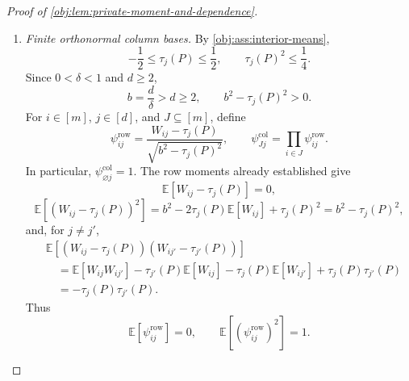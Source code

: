 \begin{proof}[Proof of \cref{obj:lem:private-moment-and-dependence}]
\begin{enumerate}
Fix \(J\in\mathcal J_k\). All moment weights are nonnegative, and the
subset \(J_{\mathrm{sub}}=J\cap J'\) is one of the terms in
\[
b^{2|J\cap J'|}
\bigl(\tau_j(P)^2\bigr)^{k-|J\cap J'|}
\le
\sum_{J_{\mathrm{sub}}\subseteq J\cap J'}
b^{2|J_{\mathrm{sub}}|}
\bigl(\tau_j(P)^2\bigr)^{k-|J_{\mathrm{sub}}|}.
\]
Summing over \(J'\), interchanging the finite sums, and applying the
inclusion count bound gives
\[
\begin{aligned}
&\sum_{J'\in\mathcal J_k}
b^{2|J\cap J'|}
\bigl(\tau_j(P)^2\bigr)^{k-|J\cap J'|}\\
&\quad\le
\sum_{J_{\mathrm{sub}}\subseteq J}
b^{2|J_{\mathrm{sub}}|}
\bigl(\tau_j(P)^2\bigr)^{k-|J_{\mathrm{sub}}|}
\#\{J'\in\mathcal J_k:J_{\mathrm{sub}}\subseteq J'\}\\
&\quad\le
\binom mk
\sum_{J_{\mathrm{sub}}\subseteq J}
\left(\frac{2kb^2}{m}\right)^{|J_{\mathrm{sub}}|}
\bigl(\tau_j(P)^2\bigr)^{k-|J_{\mathrm{sub}}|}\\
&\quad=
\binom mk
\sum_{v=0}^k\binom kv
\left(\frac{2kb^2}{m}\right)^v
\bigl(\tau_j(P)^2\bigr)^{k-v}\\
&\quad=
\binom mk
\left(\tau_j(P)^2+\frac{2kb^2}{m}\right)^k.
\end{aligned}
\]
The penultimate equality counts the \(v\)-subsets of \(J\), and the final
equality is the binomial expansion. Averaging this row bound over
\(J\in\mathcal J_k\) proves
\[
\begin{aligned}
\mathbb E[\mathsf U_{kj}^2]
&\le
\binom mk^{-2}\binom mk\binom mk
\left(\tau_j(P)^2+\frac{2kb^2}{m}\right)^k\\
&=
\left(\tau_j(P)^2+\frac{2kb^2}{m}\right)^k.
\end{aligned}
\]

\item \textit{Finite orthonormal column bases.}
By \cref{obj:ass:interior-means},
\[
-\frac12\le\tau_j(P)\le\frac12,
\qquad
\tau_j(P)^2\le\frac14.
\]
Since \(0<\delta<1\) and \(d\ge2\),
\[
b=\frac d\delta>d\ge2,
\qquad
b^2-\tau_j(P)^2>0.
\]
For \(i\in[m]\), \(j\in[d]\), and \(J\subseteq[m]\), define
\[
\psi^{\mathrm{row}}_{ij}
=
\frac{W_{ij}-\tau_j(P)}
{\sqrt{b^2-\tau_j(P)^2}},
\qquad
\psi^{\mathrm{col}}_{Jj}
=
\prod_{i\in J}\psi^{\mathrm{row}}_{ij}.
\]
In particular, \(\psi^{\mathrm{col}}_{\varnothing j}=1\).
The row moments already established give
\[
\mathbb E[W_{ij}-\tau_j(P)]=0,
\]
\[
\mathbb E[(W_{ij}-\tau_j(P))^2]
=
b^2-2\tau_j(P)\mathbb E[W_{ij}]+\tau_j(P)^2
=
b^2-\tau_j(P)^2,
\]
and, for \(j\ne j'\),
\[
\begin{aligned}
&\mathbb E[(W_{ij}-\tau_j(P))(W_{ij'}-\tau_{j'}(P))]\\
&\quad=
\mathbb E[W_{ij}W_{ij'}]
-\tau_{j'}(P)\mathbb E[W_{ij}]
-\tau_j(P)\mathbb E[W_{ij'}]
+\tau_j(P)\tau_{j'}(P)\\
&\quad=-\tau_j(P)\tau_{j'}(P).
\end{aligned}
\]
Thus
\[
\mathbb E[\psi^{\mathrm{row}}_{ij}]=0,
\qquad
\mathbb E[(\psi^{\mathrm{row}}_{ij})^2]=1.
\]


\end{enumerate}
\end{proof}
